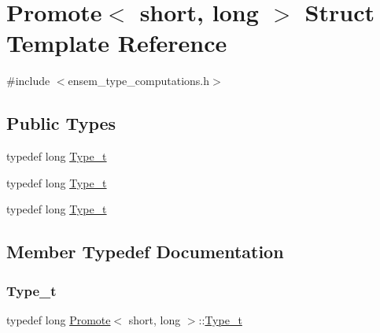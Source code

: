 \hypertarget{structPromote_3_01short_00_01long_01_4}{}\section{Promote$<$ short, long $>$ Struct Template Reference}
\label{structPromote_3_01short_00_01long_01_4}


{\ttfamily \#include $<$ensem\+\_\+type\+\_\+computations.\+h$>$}

\subsection*{Public Types}
\begin{DoxyCompactItemize}
\item 
typedef long \mbox{\hyperlink{structPromote_3_01short_00_01long_01_4_a46884a4f8850dbebc27c57717668957b}{Type\+\_\+t}}
\item 
typedef long \mbox{\hyperlink{structPromote_3_01short_00_01long_01_4_a46884a4f8850dbebc27c57717668957b}{Type\+\_\+t}}
\item 
typedef long \mbox{\hyperlink{structPromote_3_01short_00_01long_01_4_a46884a4f8850dbebc27c57717668957b}{Type\+\_\+t}}
\end{DoxyCompactItemize}


\subsection{Member Typedef Documentation}
\mbox{\label{structPromote_3_01short_00_01long_01_4_a46884a4f8850dbebc27c57717668957b}} 
\subsubsection{\texorpdfstring{Type\_t}{Type\_t}\hspace{0.1cm}{\footnotesize\ttfamily [1/3]}}
{\footnotesize\ttfamily typedef long \mbox{\hyperlink{structPromote}{Promote}}$<$ short, long $>$\+::\mbox{\hyperlink{structPromote_3_01short_00_01long_01_4_a46884a4f8850dbebc27c57717668957b}{Type\+\_\+t}}}

\mbox{\label{structPromote_3_01short_00_01long_01_4_a46884a4f8850dbebc27c57717668957b}} 
